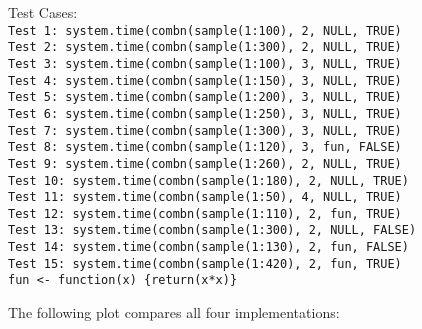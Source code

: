 Test Cases:\\
\null
\texttt{Test 1: system.time(combn(sample(1:100), 2, NULL, TRUE)}\\
\texttt{Test 2: system.time(combn(sample(1:300), 2, NULL, TRUE)}\\
\texttt{Test 3: system.time(combn(sample(1:100), 3, NULL, TRUE)}\\
\texttt{Test 4: system.time(combn(sample(1:150), 3, NULL, TRUE)}\\
\texttt{Test 5: system.time(combn(sample(1:200), 3, NULL, TRUE)}\\
\texttt{Test 6: system.time(combn(sample(1:250), 3, NULL, TRUE)}\\
\texttt{Test 7: system.time(combn(sample(1:300), 3, NULL, TRUE)}\\

\texttt{Test 8: system.time(combn(sample(1:120), 3, fun, FALSE)}\\
\texttt{Test 9: system.time(combn(sample(1:260), 2, NULL, TRUE)}\\
\texttt{Test 10: system.time(combn(sample(1:180), 2, NULL, TRUE)}\\
\texttt{Test 11: system.time(combn(sample(1:50), 4, NULL, TRUE)}\\
\texttt{Test 12: system.time(combn(sample(1:110), 2, fun, TRUE)}\\
\texttt{Test 13: system.time(combn(sample(1:300), 2, NULL, FALSE)}\\
\texttt{Test 14: system.time(combn(sample(1:130), 2, fun, FALSE)}\\
\texttt{Test 15: system.time(combn(sample(1:420), 2, fun, TRUE)}\\
\null
\texttt{fun <- function(x) \{return(x*x)\}}\\
\null

The following plot compares all four implementations:\\